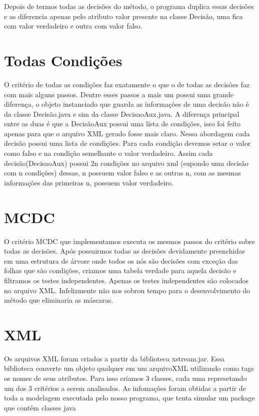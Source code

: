 \documentclass[12pt]{article} %
\begin{document}
	Depois de termos todas as decisões do método, o programa duplica essas decisões e as diferencia apenas pelo atributo valor presente na classe
Decisão, uma fica com valor verdadeiro e outra com valor falso. 

\newpage

\section{Todas Condições}
\mbox{}

	O critério de todas as condições faz exatamente o que o de todas as decisões faz com mais alguns passos. Dentre esses passos a mais um 
possui uma grande diferença, o objeto instanciado que guarda as informações de uma decisão não é da classe Decisão.java e sim da classe 
DecisaoAux.java. A diferença principal entre as duas é que a DecisãoAux possui uma lista de condições, isso foi feito apenas para que o arquivo 
XML gerado fosse mais claro. Nessa abordagem cada decisão possui uma lista de condições. Para cada condição devemos setar o valor como falso
e na condição semelhante o valor verdadeiro. Assim cada decisão(DecisaoAux) possui 2n condições no arquivo xml (supondo uma decisão com n condições) dessas, n possuem valor falso e as outras n, com as mesmas informações das primeiras n, possuem valor verdadeiro. 

\section{MCDC}
\mbox{}

	O critério MCDC que implementamos executa os mesmos passos do critério sobre todas as decisões. Após possuirmos todas as decisões
devidamente preenchidas em uma estrutura de árvore onde todos os nós são decisões com exceção das folhas que são condições, criamos uma tabela verdade para aquela decisão e filtramos os testes independentes. Apenas os testes independentes são colocados no arquivo XML. Infelizmente não nos sobrou tempo para o desenvolvimento do método que eliminaria as máscaras. 

\section{XML}
\mbox{}

	Os arquivos XML foram criados a partir da biblioteca xstream.jar. Essa biblioteca converte um objeto qualquer em um arquivoXML utilizando como 
tags os nomes de seus atributos. Para isso criamos 3 classes, cada uma represetando um dos 3 critérios a serem analisados. As infomações foram obtidas a partir de toda a modelagem executada pelo nosso programa, que tenta simular um package que contém classes java
\end{document}
